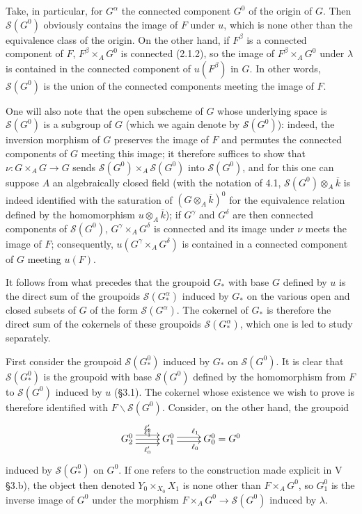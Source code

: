 Take, in particular, for $G^\alpha$ the connected component $G^0$ of the origin of $G$. Then $\mathcal S(G^0)$ obviously contains the image of $F$ under $u$, which is none other than the equivalence class of the origin. On the other hand, if $F^\beta$ is a connected component of $F$, $F^\beta\times_AG^0$ is connected (2.1.2), so the image of $F^\beta\times_AG^0$ under $\lambda$ is contained in the connected component of $u(F^\beta)$ in $G$. In other words, $\mathcal S(G^0)$ is the union of the connected components meeting the image of $F$.

One will also note that the open subscheme of $G$ whose underlying space is $\mathcal S(G^0)$ is a subgroup of $G$ (which we again denote by $\mathcal S(G^0)$): indeed, the inversion morphism of $G$ preserves the image of $F$ and permutes the connected components of $G$ meeting this image; it therefore suffices to show that $\nu:G\times_AG\to G$ sends $\mathcal S(G^0)\times_A\mathcal S(G^0)$ into $\mathcal S(G^0)$, and for this one can suppose $A$ an algebraically closed field (with the notation of 4.1, $\mathcal S(G^0)\otimes_A\overline k$ is indeed identified with the saturation of $(G\otimes_A\overline k)^0$ for the equivalence relation defined by the homomorphism $u\otimes_A\overline k$); if $G^\gamma$ and $G^\delta$ are then connected components of $\mathcal S(G^0)$, $G^\gamma\times_AG^\delta$ is connected and its image under $\nu$ meets the image of $F$; consequently, $u(G^\gamma\times_AG^\delta)$ is contained in a connected component of $G$ meeting $u(F)$.

It follows from what precedes that the groupoid $G_*$ with base $G$ defined by $u$ is the direct sum of the groupoids $\mathcal S(G^\alpha_*)$ induced by $G_*$ on the various open and closed subsets of $G$ of the form $\mathcal S(G^\alpha)$. The cokernel of $G_*$ is therefore the direct sum of the cokernels of these groupoids $\mathcal S(G^\alpha_*)$, which one is led to study separately.

First consider the groupoid $\mathcal S(G^0_*)$ induced by $G_*$ on $\mathcal S(G^0)$. It is clear that $\mathcal S(G^0_*)$ is the groupoid with base $\mathcal S(G^0)$ defined by the homomorphism from $F$ to $\mathcal S(G^0)$ induced by $u$ (§3.1). The cokernel whose existence we wish to prove is therefore identified with $F\backslash\mathcal S(G^0)$. Consider, on the other hand, the groupoid
\[
\xymatrix{G^0_2\ar@<1ex>[r]^{\ell'_2}\ar[r]^{\ell'_1}\ar@<-1ex>[r]_{\ell'_0}&G^0_1\ar@<.5ex>[r]^{\ell_1}\ar@<-.5ex>[r]_{\ell_0}&G^0_0=G^0}
\]
induced by $\mathcal S(G^0_*)$ on $G^0$. If one refers to the construction made explicit in V §3.b), the object then denoted $Y_0\times_{X_0}X_1$ is none other than $F\times_AG^0$, so $G^0_1$ is the inverse image of $G^0$ under the morphism $F\times_AG^0\to\mathcal S(G^0)$ induced by $\lambda$.

